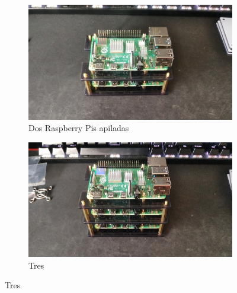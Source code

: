 \begin{itemize}
    \begin{figure}[h!]
    \centering
    \begin{subfigure}[c]{0.4\textwidth}
        \includegraphics[width=\textwidth]{img/apilamiento/2.jpg}
        \caption{Dos Raspberry Pis apiladas}
        \label{fig:apilamiento_2}
    \end{subfigure}
    \begin{subfigure}[c]{0.4\textwidth}
        \includegraphics[width=\textwidth]{img/apilamiento/3.jpg}
        \caption{Tres}
        \label{fig:apilamiento_3}
    \end{subfigure}


\end{figure}
\end{itemize}
